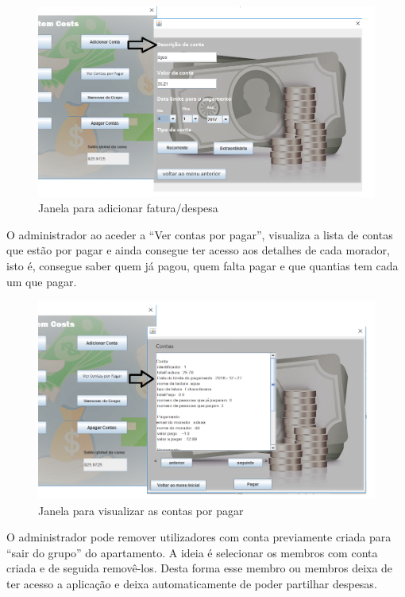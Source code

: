 \begin{figure}[h!]
	\centering
	\includegraphics[scale=0.5]{imagens/interface/adicionarcontaadmin}  
	\caption{Janela para adicionar fatura/despesa}  
\end{figure}

O administrador ao aceder a “Ver contas por pagar”, visualiza a lista de contas que estão por pagar e ainda consegue ter acesso aos detalhes de cada morador, isto é, consegue saber quem já pagou, quem falta pagar e que quantias tem cada um que pagar.

\begin{figure}[h!]
	\centering
	\includegraphics[scale=0.5]{imagens/interface/vercontasporpagaradmin}  
	\caption{Janela para visualizar as contas por pagar}  
\end{figure}

\newpage
O administrador pode remover utilizadores com conta previamente criada para “sair do grupo” do apartamento. A ideia é selecionar os membros com conta criada e de seguida removê-los. Desta forma esse membro ou membros deixa de ter acesso a aplicação e deixa automaticamente de poder partilhar despesas. 

